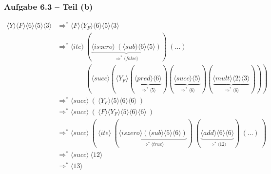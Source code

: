 \documentclass[aspectratio=1610,onlymath, ngerman]{beamer}
\renewcommand{\emph}[1]{\textbf{#1}}
\newcommand{\colll}[1]{\textcolor{cdorange}{\boldsymbol{#1}}}
\newcommand{\num}[1]{\ensuremath{\langle #1 \rangle}}
\begin{document}
%	    	
%	    	
%	    	
%	    	
%	    
    
    \begin{frame} \frametitle{Aufgabe 6.3 -- Teil (b)}
    \small
	    \begin{align*}
	    \num{Y} \num{F} \num{6} \num{5} \num{3} &\Rightarrow^\ast \num{F} \num{Y_F} \num{6} \num{5} \num{3} \\
	    &\Rightarrow^\ast \num{ite} \ 
	    (\underbrace{\num{iszero} \ (\num{sub}\num{6}\num{5})}_{\Rightarrow^\ast \num{false}}) \ 
	    ( \dots ) \\
	    & \phantom{\Rightarrow^\ast \num{ite}} \ (\num{succ} (\num{Y_F}(\underbrace{\num{pred}\num{6}}_{\Rightarrow^\ast \num{5}})(\underbrace{\num{succ}\num{5}}_{\Rightarrow^\ast \num{6}})(\underbrace{\num{mult}\num{2}\num{3}}_{\Rightarrow^\ast \num{6}}))) \\
	    &\Rightarrow^\ast \num{succ} \  ( \ \num{Y_F}\num{5}\num{6}\num{6} \ ) \\
	    &\Rightarrow^\ast \num{succ} \ ( \ \num{F} \num{Y_F} \num{5}\num{6}\num{6} \ ) \\
	    &\Rightarrow^\ast \num{succ} \ ( \ \num{ite} \  (\underbrace{\num{iszero}(\num{sub}\num{5}\num{6})}_{\Rightarrow^\ast \num{true}}) \ (\underbrace{\num{add}\num{6}\num{6}}_{\Rightarrow^\ast \num{12}})  \ (\dots) \ ) \\
	    &\Rightarrow^\ast \num{succ} \ \num{12} \\
	    &\Rightarrow^\ast \num{13}
	    \end{align*}
	\end{frame}
    
\end{document}

